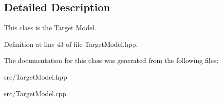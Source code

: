 \subsection{Detailed Description}
This class is the Target Model. 

Definition at line 43 of file Target\+Model.\+hpp.



The documentation for this class was generated from the following files\+:\begin{DoxyCompactItemize}
\item 
src/Target\+Model.\+hpp\item 
src/Target\+Model.\+cpp\end{DoxyCompactItemize}

